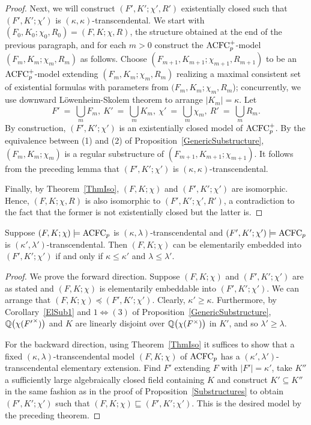 \begin{proof}
Next, we will construct $ (F', K'; \chi', R')$ existentially closed such that $(F',K'; \chi')$ is $(\kappa,\kappa)$-transcendental. We start with $ (F_0, K_0; \chi_0, R_0) = (F, K; \chi, R) $, the structure obtained at the end of the previous paragraph, and for each $m>0$ construct the $\mathrm{ACFC}_p^+$-model $ (F_m, K_m; \chi_m, R_m)$ as follows.
Choose $(F_{m+1}, K_{m+1}; \chi_{m+1}, R_{m+1})$ to be an $\mathrm{ACFC}_p^+$-model extending $(F_m, K_m; \chi_m, R_m)$ realizing a maximal consistent set of existential formulas with parameters from $(F_m, K_m; \chi_m, R_m$); concurrently, we use downward L\"owenheim-Skolem theorem to arrange $|K_m| = \kappa$.  Let $$F'\ =\ \bigcup_m F_m,\ K'\ =\ \bigcup_m K_m,\ \chi'\ =\ \bigcup_m \chi_m,\ R'\ =\ \bigcup_m R_m.$$ By construction, $(F',K'; \chi')$ is an existentially closed model of $\mathrm{ACFC}_p^+$. By the equivalence between (1) and (2) of Proposition~\ref{GenericSubstructure},  $( F_m, K_m; \chi_m)$ is a regular substructure of $( F_{m+1}, K_{m+1}; \chi_{m+1})$.
It follows from the preceding lemma that $(F', K'; \chi')$ is $(\kappa, \kappa)$-transcendental.

Finally, by Theorem~\ref{ThmIso}, $ (F, K; \chi)$  and  $ (F', K'; \chi')$ are isomorphic. Hence, $(F, K; \chi, R)$ is also isomorphic to $ (F', K'; \chi', R')$, a contradiction to the fact that the former is not existentially closed but the latter is.
\end{proof}

\begin{cor} \label{ElementarilyEmbeddable}
Suppose $(F, K; \chi) \models \mathrm{ACFC}_p$ is $(\kappa, \lambda)$-transcendental and $(F', K'; \chi') \models \mathrm{ACFC}_p$ is $(\kappa', \lambda')$-transcendental. Then $(F, K; \chi) $ can be elementarily embedded into $(F', K'; \chi')$ if and only if $\kappa \leq \kappa'$ and    $\lambda \leq \lambda'$.
\end{cor}

\begin{proof}
We prove the forward direction. Suppose $(F, K; \chi)$ and $(F', K'; \chi')$ are as stated and $(F, K; \chi)$ is elementarily embeddable into $(F', K'; \chi')$. We can arrange that $(F, K; \chi) \preccurlyeq (F', K'; \chi') $. Clearly, $\kappa' \geq \kappa$.  Furthermore, by Corollary~\ref{ElSub1} and $1 \Leftrightarrow(3)$ of Proposition~\ref{GenericSubstructure}, $\mathbb{Q}\big(\chi({F'}^\times)\big)$ and $K$ are linearly disjoint over $\mathbb{Q}\big(\chi(F^\times)\big)$ in $K'$, and so  $\lambda' \geq \lambda$.

For the backward direction, using Theorem~\ref{ThmIso} it suffices to show that a fixed $(\kappa, \lambda)$-transcendental model $(F, K; \chi)$ of $ \mathrm{ACFC}_p$ has a $(\kappa', \lambda')$-transcendental elementary extension. Find $F'$ extending $F$ with $|F'| =\kappa'$, take $K''$ a sufficiently large algebraically closed field containing $K$ and construct $K' \subseteq K''$ in the same fashion as in the proof of Proposition~\ref{Substructures} to obtain $(F', K'; \chi')$ such that $(F,K;\chi) \sqsubseteq (F',K';\chi')$. This is the desired model by the preceding theorem.
\end{proof}
